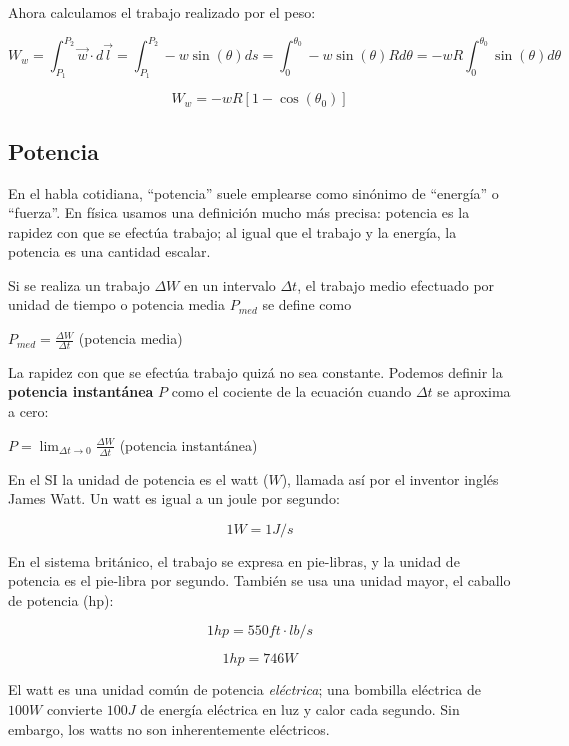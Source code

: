 \documentclass{article}
\newcommand{\newsubsection}[1]{
    \vspace{0.5cm}
    \color{sectionColor}
    \subsection{\bl{#1}}
    \color{black}
    \vspace{0.5cm}
}
\newcommand{\bl}[1]{\textbf{#1}}
\newcommand{\definicion}[1]{%
    \vspace{0.5cm}
    \begin{definicionbox}
        #1
    \end{definicionbox}
    \vspace{0.5cm}
}
\begin{document}
    \par Ahora calculamos el trabajo realizado por el peso:

    \[ W_{w} = \int_{P_1}^{P_2} \vec{w} \cdot d\vec{l} = \int_{P_1}^{P_2} -w \sin(\theta) ds = \int_{0}^{\theta_0} -w \sin(\theta) R d\theta = -w R \int_{0}^{\theta_0} \sin(\theta) d\theta \]

    \[ W_{w} = -w R [ 1 - \cos(\theta_0) ] \]

    \newsubsection{Potencia}

    \par En el habla cotidiana, “potencia” suele emplearse como sinónimo de “energía” o “fuerza”. En física usamos una deﬁnición mucho más precisa: potencia es la rapidez con que se efectúa trabajo; al igual que el trabajo y la energía, la potencia es una cantidad escalar.

    \par Si se realiza un trabajo $\Delta W$ en un intervalo $\Delta t$, el trabajo medio efectuado por unidad de tiempo o potencia media $P_{med}$ se deﬁne como

    \definicion{
        \centering
        \( P_{med} = \frac{\Delta W}{\Delta t} \) \quad (potencia media)
    }

    \par La rapidez con que se efectúa trabajo quizá no sea constante. Podemos deﬁnir la \bl{potencia instantánea} $P$ como el cociente de la ecuación cuando $\Delta t$ se aproxima a cero:

    \definicion{
        \centering
        \( P = \lim_{\Delta t \to 0} \frac{\Delta W}{\Delta t} \) \quad (potencia instantánea)
    }

    \par En el SI la unidad de potencia es el watt ($W$), llamada así por el inventor inglés James Watt. Un watt es igual a un joule por segundo:

    \[ 1 W = 1 J/s \]

    \par En el sistema británico, el trabajo se expresa en pie-libras, y la unidad de potencia es el pie-libra por segundo. También se usa una unidad mayor, el caballo de potencia (hp):

    \[ 1 hp = 550 ft \cdot lb/s \]

    \[ 1 hp = 746 W \]

    \par El watt es una unidad común de potencia \textit{eléctrica}; una bombilla eléctrica de $100 W$ convierte $100 J$ de energía eléctrica en luz y calor cada segundo. Sin embargo, los watts no son inherentemente eléctricos.
\end{document}
